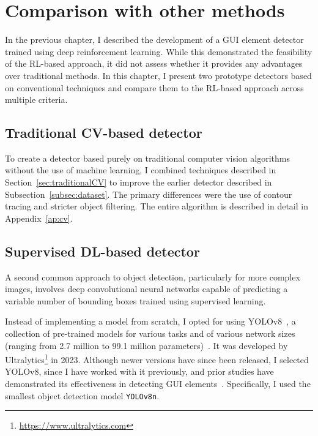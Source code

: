 \documentclass[
  digital,     %
  oneside,     %
  nosansbold,  %
  nocolorbold, %
  lof,         %
  lot,         %
]{fithesis4}
\begin{document}
\chapter{Comparison with other methods}
\label{ch:comparisons}

In the previous chapter, I described the development of a GUI element detector trained using deep reinforcement learning. While this demonstrated the feasibility of the RL-based approach, it did not assess whether it provides any advantages over traditional methods. In this chapter, I present two prototype detectors based on conventional techniques and compare them to the RL-based approach across multiple criteria.

\section{Traditional CV-based detector}
\label{sec:trad_cv_detector}

To create a detector based purely on traditional computer vision algorithms without the use of machine learning, I combined techniques described in Section~\ref{sec:traditionalCV} to improve the earlier detector described in Subsection~\ref{subsec:dataset}. The primary differences were the use of contour tracing and stricter object filtering. The entire algorithm is described in detail in Appendix~\ref{ap:cv}.

\section{Supervised DL-based detector}
\label{sec:yolo}

A second common approach to object detection, particularly for more complex images, involves deep convolutional neural networks capable of predicting a variable number of bounding boxes trained using supervised learning.

Instead of implementing a model from scratch, I opted for using YOLOv8~\cite{yolov8_ultralytics}, a collection of pre-trained models for various tasks and of various network sizes (ranging from 2.7 million to 99.1 million parameters)~\cite{ultralytics-docs}. It was developed by Ultralytics\footnote{\url{https://www.ultralytics.com}} in 2023. Although newer versions have since been released, I selected YOLOv8, since I have worked with it previously, and prior studies have demonstrated its effectiveness in detecting GUI elements~\cite{GUI_YOLO_comparison}. Specifically, I used the smallest object detection model \texttt{YOLOv8n}.
\end{document}
